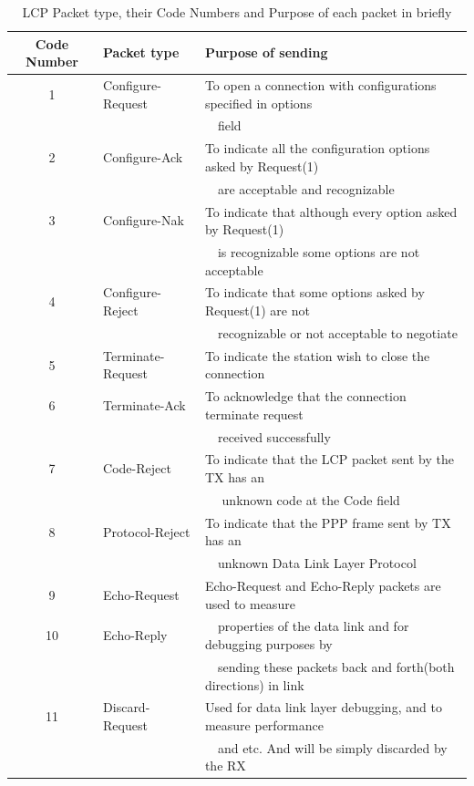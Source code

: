 \documentclass[a4paper,11pt]{article}%
\begin{document}
\begin{table}[!h]
	\centering
\begin{tabular}{c| l |l}
	\textbf{Code Number}& \textbf{Packet type} &\textbf{Purpose of sending}\\\hline
	1 &Configure-Request& To open a connection with configurations specified in options \\
	&&~~field\\
	
	2 &Configure-Ack&To indicate all the configuration options asked by Request(1)  \\
	&&~~are acceptable and recognizable\\
	
	3 &Configure-Nak&To indicate that although every option asked by Request(1) \\
	&&~~is recognizable some options are not acceptable\\
	
	4 &Configure-Reject&To indicate that some options asked by Request(1) are not \\
	&& ~~recognizable or not acceptable to negotiate\\\hline
	
	
	5 &Terminate-Request&To indicate the station wish to close the connection\\
	
	6 &Terminate-Ack&To acknowledge that the connection terminate request  \\
	&&~~received successfully\\\hline
	
	7 &Code-Reject&To indicate that the LCP packet sent by the TX has an\\
	&&~~ unknown code at the Code field\\ 
	8 &Protocol-Reject&To indicate that the PPP frame sent by TX has an\\
	&& ~~unknown Data Link Layer Protocol\\
	9 &Echo-Request&Echo-Request and Echo-Reply packets are used to measure \\ 
	10& Echo-Reply&~~properties of the data link and for debugging purposes by\\
	&&~~sending these packets back and forth(both directions) in link \\
	11 &Discard-Request& Used for data link layer debugging, and to measure performance\\
	&& ~~and etc. And will be simply discarded by the RX\\\hline\hline

\end{tabular}
\caption{LCP Packet type, their Code Numbers and Purpose of each packet in briefly\cite{ppp}}
\end{table}
\end{document}
